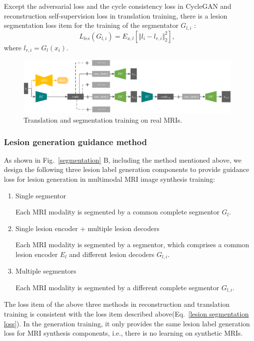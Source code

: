 \documentclass[runningheads]{llncs}
\begin{document}
Except the adversarial loss and the cycle consistency loss in CycleGAN\cite{6zhu2017unpaired} and reconstruction self-supervision loss in translation training, there is a lesion segmentation loss item for the training of the segmentator $G_{l,i}$ :
\begin{equation}
\label{lesion segmentation loss}
L_{les}(G_{l,i})=E_{x,l}[\Vert{l_i-l_{r,i}}\Vert_{2}^{2}],
\end{equation}
where $l_{r,i}=G_l(x_{i})$.

\begin{figure}
	\centering
	\includegraphics[width=1\columnwidth]{figures/trans_train}
	\caption{Translation and segmentation training on real MRIs.}
	\label{trans_train}
\end{figure}

\subsubsection{Lesion generation guidance method}
\label{label gen methods}
As shown in Fig.~\ref{segmentation} B, including the method mentioned above, we design the following three lesion label generation components to provide guidance loss for lesion generation in multimodal MRI image synthesis training:
\begin{enumerate}
	\item{Single segmentor} 
	
	Each MRI modality  is segmented by a common complete segmentor $G_l$.
	\item{Single lesion encoder + multiple lesion decoders} 
	
	Each MRI modality  is segmented by a segmentor, which comprises a common lesion encoder $E_{l}$ and different lesion decoders $G_{l,i}$. 
	\item{Multiple segmentors} 
	
	Each MRI modality  is segmented by a different complete segmentor $G_{l,i}$.
\end{enumerate}
The loss item of the above three methods in reconstruction and translation training is consistent with the loss item described above(Eq.~\ref{lesion segmentation loss}). In the generation training, it only provides the same lesion label generation loss for MRI synthesis components, i.e., there is no learning on synthetic MRIs.
\end{document}

